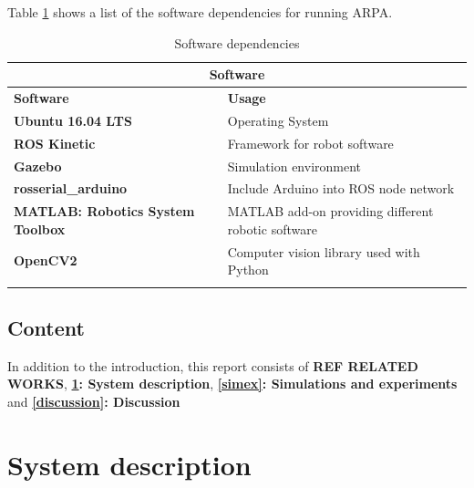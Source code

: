 \documentclass[11pt,a4paper, titlepage]{article}
\begin{document}
Table \ref{software} shows a list of the software dependencies for running ARPA.

	\begin{center}           
    \begin{longtable}{| l | l |}
              \hline
\multicolumn{2}{|c|}{\textbf{Software}} \\ \hline \endhead
\textbf{Software} & \textbf{Usage} \\ \hline             
              \textbf{Ubuntu 16.04 LTS} & Operating System \\ \hline
              
              \textbf{ROS Kinetic} & Framework for robot software \\ \hline
              
              \textbf{Gazebo} & Simulation environment \\  \hline
             
              \textbf{rosserial\_arduino} & Include Arduino into ROS node network \\ \hline
              
              \textbf{MATLAB: Robotics System Toolbox} & MATLAB add-on providing different robotic software \\ \hline
              
              \textbf{OpenCV2} & Computer vision library used with Python \\  \hline

\caption{Software dependencies}
\label{software}                                       
\end{longtable}
\end{center}     

\subsection{Content}
In addition to the introduction, this report consists of \textbf{REF RELATED WORKS}, \textbf{\ref{description}: System description}, \textbf{\ref{simex}: Simulations and experiments} and \textbf{\ref{discussion}: Discussion}

\section{System description}
\label{description}
	
\end{document}
